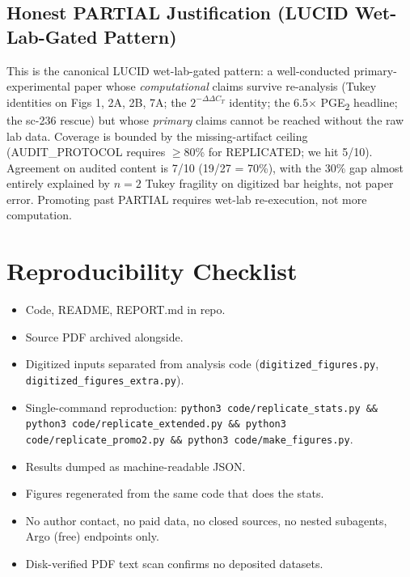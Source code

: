 \documentclass[11pt]{article}
\begin{document}
\subsection{Honest PARTIAL Justification (LUCID Wet-Lab-Gated Pattern)}
This is the canonical LUCID wet-lab-gated pattern: a well-conducted primary-experimental paper whose \emph{computational} claims survive re-analysis (Tukey identities on Figs 1, 2A, 2B, 7A; the $2^{-\Delta\Delta C_T}$ identity; the 6.5$\times$ PGE\textsubscript{2} headline; the sc-236 rescue) but whose \emph{primary} claims cannot be reached without the raw lab data. Coverage is bounded by the missing-artifact ceiling (AUDIT\_PROTOCOL requires $\geq$80\% for REPLICATED; we hit 5/10). Agreement on audited content is 7/10 (19/27 = 70\%), with the 30\% gap almost entirely explained by $n=2$ Tukey fragility on digitized bar heights, not paper error. Promoting past PARTIAL requires wet-lab re-execution, not more computation.

\section{Reproducibility Checklist}
\begin{itemize}
    \item[$\checkmark$] Code, README, REPORT.md in repo.
    \item[$\checkmark$] Source PDF archived alongside.
    \item[$\checkmark$] Digitized inputs separated from analysis code (\texttt{digitized\_figures.py}, \texttt{digitized\_figures\_extra.py}).
    \item[$\checkmark$] Single-command reproduction: \texttt{python3 code/replicate\_stats.py \&\& python3 code/replicate\_extended.py \&\& python3 code/replicate\_promo2.py \&\& python3 code/make\_figures.py}.
    \item[$\checkmark$] Results dumped as machine-readable JSON.
    \item[$\checkmark$] Figures regenerated from the same code that does the stats.
    \item[$\checkmark$] No author contact, no paid data, no closed sources, no nested subagents, Argo (free) endpoints only.
    \item[$\checkmark$] Disk-verified PDF text scan confirms no deposited datasets.
\end{itemize}


\end{document}
